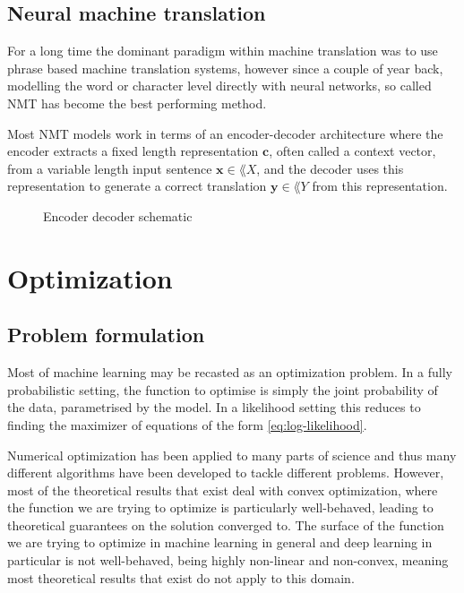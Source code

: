 \subsection{Neural machine translation}
For a long time the dominant paradigm within machine translation was to use
phrase based machine translation systems\cite{Koehn:2003:SPT:1073445.1073462, Koehn:2007:MOS:1557769.1557821},
however since a couple of year back, modelling the word or character level
directly with neural networks, so called NMT has become the best performing
method\cite{wolk_neural-based_2015, wu_googles_2016}.

Most NMT models work in terms of an encoder-decoder architecture where the
encoder extracts a fixed length representation $\bm{c}$, often called a context
vector, from a variable length input sentence $\bm{x} \in \lang{X}$, and the
decoder uses this representation to generate a correct translation $\bm{y} \in
\lang{Y}$ from this representation\cite{cho_properties_2014}.

\begin{figure}[H]
    \caption{Encoder decoder schematic}
  \label{fig:encoder_decoder}
\end{figure}

\section{Optimization}

\subsection{Problem formulation}

Most of machine learning may be recasted as an optimization problem. In a fully
probabilistic setting, the function to optimise is simply the joint probability
of the data, parametrised by the model. In a likelihood setting this reduces to
finding the maximizer of equations of the form \ref{eq:log-likelihood}.

Numerical optimization has been applied to many parts of science and thus many
different algorithms have been developed to tackle different problems. However,
most of the theoretical results that exist deal with convex optimization, where
the function we are trying to optimize is particularly well-behaved, leading to
theoretical guarantees on the solution converged to. The surface of the function
we are trying to optimize in machine learning in general and deep learning in
particular is not well-behaved, being highly non-linear and non-convex, meaning
most theoretical results that exist do not apply to this domain\cite{choromanska_loss_2014}.

